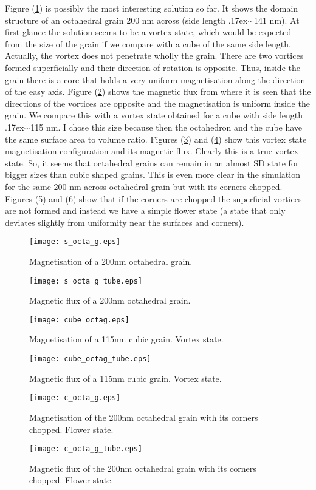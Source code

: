 Figure (\ref{Fig4}) is possibly the most interesting solution so far. It shows the domain structure of an octahedral grain 200 nm across (side length {\raise.17ex\hbox{$\scriptstyle\sim$}}141 nm). At first glance the solution seems to be a vortex state, which would be expected from the size of the grain if we compare with a cube of the same side length. Actually, the vortex does not penetrate wholly the grain. There are two vortices formed superficially and their direction of rotation is opposite. Thus, inside the grain there is a core that holds a very uniform magnetisation along the direction of the easy axis. Figure (\ref{Fig5}) shows the magnetic flux from where it is seen that the directions of the vortices are opposite and the magnetisation is uniform inside the grain. We compare this with a vortex state obtained for a cube with side length {\raise.17ex\hbox{$\scriptstyle\sim$}}115 nm. I chose this size because then the octahedron and the cube have the same surface area to volume ratio. Figures (\ref{Fig6}) and (\ref{Fig7}) show this vortex state magnetisation configuration and its magnetic flux. Clearly this is a true vortex state. So, it seems that octahedral grains can remain in an almost SD state for bigger sizes than cubic shaped grains. This is even more clear in the simulation for the same 200 nm across octahedral grain but with its corners chopped. Figures (\ref{Fig8}) and (\ref{Fig9}) show that if the corners are chopped the superficial vortices are not formed and instead we have a simple flower state (a state that only deviates slightly from uniformity near the surfaces and corners).
\begin{figure}[ht]
\centering
\texttt{[image: s\_octa\_g.eps]}
\caption{Magnetisation of a 200nm octahedral grain.}
\label{Fig4}
\end{figure}
\begin{figure}[ht]
\centering
\texttt{[image: s\_octa\_g\_tube.eps]}
\caption{Magnetic flux of a 200nm octahedral grain.}
\label{Fig5}
\end{figure}
\begin{figure}[ht]
\centering
\texttt{[image: cube\_octag.eps]}
\caption{Magnetisation of a 115nm cubic grain. Vortex state.}
\label{Fig6}
\end{figure}
\begin{figure}[ht]
\centering
\texttt{[image: cube\_octag\_tube.eps]}
\caption{Magnetic flux of a 115nm cubic grain. Vortex state.}
\label{Fig7}
\end{figure}
\begin{figure}[ht]
\centering
\texttt{[image: c\_octa\_g.eps]}
\caption{Magnetisation of the 200nm octahedral grain with its corners chopped. Flower state.}
\label{Fig8}
\end{figure}
\begin{figure}[ht]
\centering
\texttt{[image: c\_octa\_g\_tube.eps]}
\caption{Magnetic flux of the 200nm octahedral grain with its corners chopped. Flower state.}
\label{Fig9}
\end{figure}

